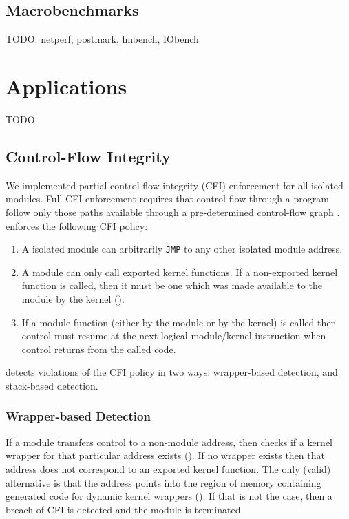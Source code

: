 \documentclass[10pt,preprint]{sigplanconf}
\begin{document}
\subsection{Macrobenchmarks}
TODO: netperf, postmark, lmbench, IObench


\section{Applications}
TODO

\subsection{Control-Flow Integrity}

We implemented partial control-flow integrity (CFI) enforcement for all isolated modules. Full CFI enforcement requires that control flow through a program follow only those paths available through a pre-determined control-flow graph \cite{Abadi2007}. {\Sysname} enforces the following CFI policy:
\begin{enumerate}
	\item A isolated module can arbitrarily \texttt{JMP} to any other isolated module address.
	\item A module can only call exported kernel functions. If a non-exported kernel function is called, then it must be one which was made available to the module by the kernel ().
	\item If a module function (either by the module or by the kernel) is called then control must resume at the next logical module/kernel instruction when control returns from the called code.
\end{enumerate}

{\Sysname} detects violations of the CFI policy in two ways: wrapper-based detection, and stack-based detection.

\subsubsection{Wrapper-based Detection}
If a module transfers control to a non-module address, then {\Sysname} checks if a kernel wrapper for that particular address exists (). If no wrapper exists then that address does not correspond to an exported kernel function. The only (valid) alternative is that the address points into the region of memory containing generated code for dynamic kernel wrappers (). If that is not the case, then a breach of CFI is detected and the module is terminated.
\end{document}
